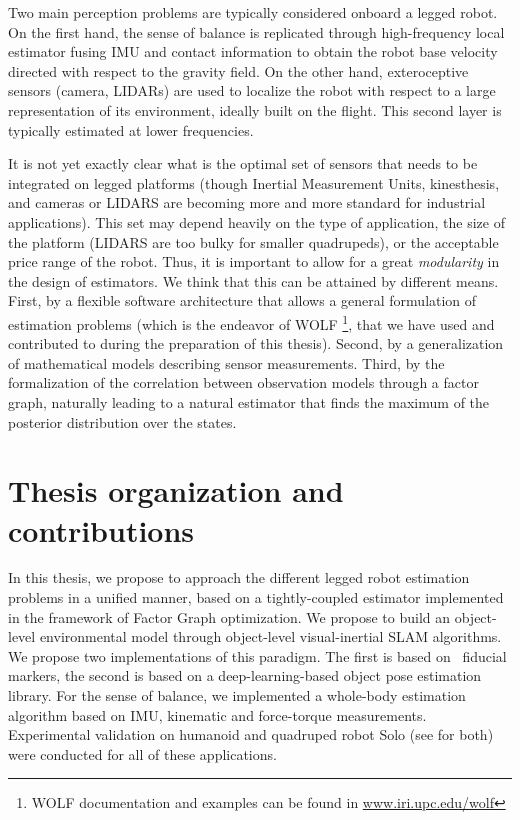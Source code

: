 Two main perception problems are typically considered onboard a legged robot. On the first hand, the sense of balance is replicated through high-frequency
local estimator fusing IMU and contact information to obtain the robot base velocity directed with respect to the gravity field. On the other hand,
exteroceptive sensors (camera, LIDARs) are used to localize the robot with respect to a large representation of its environment, ideally built on the flight.
This second layer is typically estimated at lower frequencies.

It is not yet exactly clear what is the optimal set of sensors that needs to be integrated on legged platforms (though Inertial Measurement Units, kinesthesis, and 
cameras or LIDARS are becoming more and more standard for industrial applications). This set may depend heavily on the type of application,
the size of the platform (LIDARS are too bulky for smaller quadrupeds), or the acceptable price range of the robot. Thus, it is important to allow
for a great \textit{modularity} in the design of estimators. We think that this can be attained by different means. First, by a flexible software architecture
that allows a general formulation of estimation problems (which is the endeavor of WOLF \cite{sola2021wolf} \footnote{WOLF documentation and examples can be 
found in \url{www.iri.upc.edu/wolf}}, that we have used and contributed to during the preparation of this thesis). Second, by a generalization of mathematical
 models describing sensor measurements. Third, by the formalization of the correlation between observation models through a factor graph,
 naturally leading to a natural estimator that finds the maximum of the posterior distribution over the states.
 




\section{Thesis organization and contributions}

In this thesis, we propose to approach the different legged robot estimation problems in a unified manner, based on a tightly-coupled estimator implemented in the framework of Factor Graph optimization.
We propose to build an object-level environmental model through object-level visual-inertial SLAM algorithms. We propose two implementations of this paradigm. 
The first is based on \apriltag\ fiducial markers, the second is based on a deep-learning-based object pose estimation library.   
For the sense of balance, we implemented a whole-body estimation algorithm based on IMU, kinematic and force-torque measurements.
Experimental validation on humanoid  and quadruped robot Solo (see  for both) were conducted for all of these applications.

